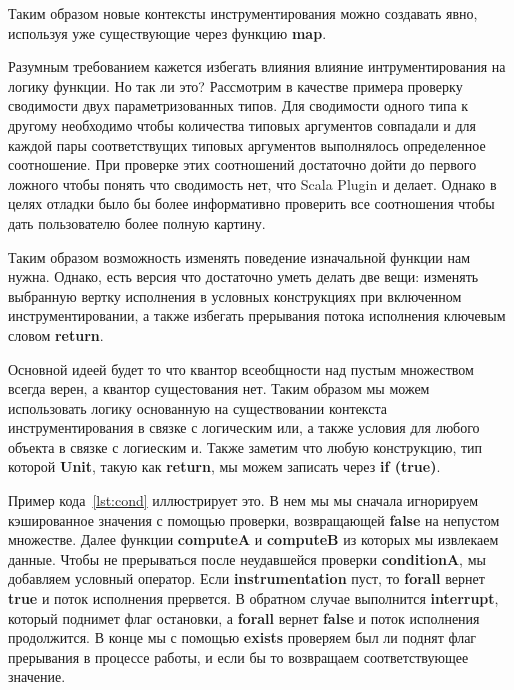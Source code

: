 Таким образом новые контексты инструментирования можно создавать явно,
используя уже существующие через функцию \textbf{map}.


Разумным требованием кажется избегать влияния влияние интрументирования на
логику функции.
Но так ли это?
Рассмотрим в качестве примера проверку сводимости двух параметризованных типов.
Для сводимости одного типа к другому необходимо чтобы количества типовых аргументов
совпадали и для каждой пары соответствущих типовых аргументов выполнялось
определенное соотношение.
При проверке этих соотношений достаточно дойти до первого ложного чтобы понять что
сводимость нет, что Scala Plugin и делает.
Однако в целях отладки было бы более информативно проверить все соотношения чтобы дать
пользователю более полную картину.

Таким образом возможность изменять поведение изначальной функции нам нужна.
Однако, есть версия что достаточно уметь делать две вещи:
изменять выбранную вертку исполнения в условных конструкциях при включенном
инструментировании, а также избегать прерывания потока исполнения ключевым
словом \textbf{return}.

Основной идеей будет то что квантор всеобщности над пустым множеством всегда
верен, а квантор сущестования нет.
Таким образом мы можем использовать логику основанную на существовании контекста
инструментирования в связке с логическим или, а также условия для любого объекта
в связке с логиеским и.
Также заметим что любую конструкцию, тип которой \textbf{Unit}, такую как
\textbf{return}, мы можем записать через \textbf{if (true)}.

Пример кода~\ref{lst:cond} иллюстрирует это.
В нем мы мы сначала игнорируем кэшированное значения с помощью проверки,
возвращающей \textbf{false} на непустом множестве.
Далее функции \textbf{computeA} и \textbf{computeB} из которых мы извлекаем данные.
Чтобы не прерываться после неудавшейся проверки \textbf{conditionA}, мы добавляем
условный оператор.
Если \textbf{instrumentation} пуст, то \textbf{forall} вернет \textbf{true} и
поток исполнения прервется.
В обратном случае выполнится \textbf{interrupt}, который поднимет флаг остановки, а
\textbf{forall} вернет \textbf{false} и поток исполнения продолжится.
В конце мы с помощью \textbf{exists} проверяем был ли поднят флаг прерывания в
процессе работы, и если бы то возвращаем соответствующее значение.

